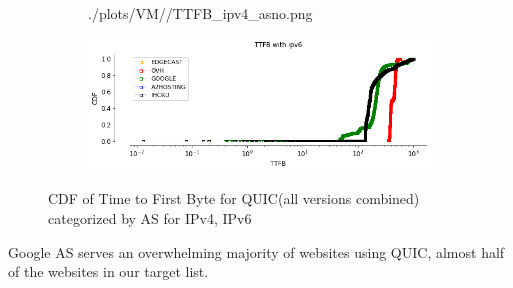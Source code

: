 \begin{frame}
\begin{figure}[!htb]
\begin{subfigure}{0.45\textwidth}
        {./plots/VM//TTFB_ipv4_asno.png}
    \end{subfigure}
    \begin{subfigure}{0.45\textwidth}
        \includegraphics[width=\linewidth]
        {./plots/VM/TTFB_ipv6_asno.png}
    \end{subfigure}
    \caption{\label{fig:TTFB_ipv6_asno}CDF of Time to First Byte for QUIC(all versions combined) categorized by AS for IPv4, IPv6}
\end{figure}
Google AS serves an overwhelming majority of websites using QUIC, almost half of the websites in our target list.
\end{frame}
\clearpage
